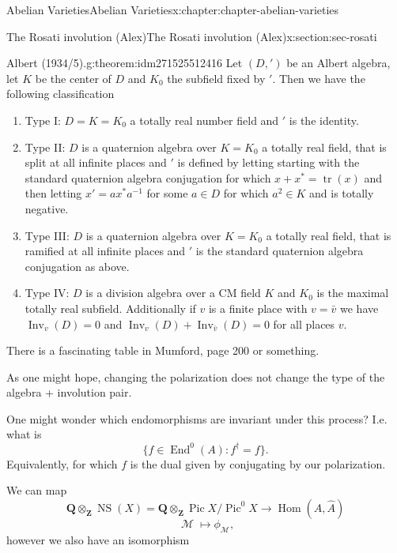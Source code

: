 \documentclass[oneside,10pt,]{book}
\numberwithin{equation}{section}
\newcommand{\sheaf}[1]{\operatorname{\mathcal{#1}}}
\newcommand{\ZZ}{\mathbf{Z}}
\newcommand{\QQ}{\mathbf{Q}}
\DeclareMathOperator{\End}{End}
\DeclareMathOperator{\Hom}{Hom}
\DeclareMathOperator{\Pic}{Pic}
\DeclareMathOperator{\tr}{tr}
\DeclareMathOperator{\NS}{NS}
\begin{document}
\begin{chapterptx}{Abelian Varieties}{}{Abelian Varieties}{}{}{x:chapter:chapter-abelian-varieties}
\begin{sectionptx}{The Rosati involution (Alex)}{}{The Rosati involution (Alex)}{}{}{x:section:sec-rosati}
\begin{theorem}{Albert (1934\slash{}5).}{}{g:theorem:idm271525512416}%
Let \((D, ')\) be an Albert algebra, let \(K\) be the center of \(D\) and \(K_0\) the subfield fixed by \('\). Then we have the following classification%
\begin{enumerate}
\item{}Type I: \(D = K = K_0\) a totally real number field and \('\) is the identity.%
\item{}Type II: \(D\) is a quaternion algebra over \(K = K_0\) a totally real field, that is split at all infinite places and \('\) is defined by letting starting with the standard quaternion algebra conjugation for which \(x + x^* = \tr(x)\) and then letting \(x' = ax^* a^{-1}\) for some \(a \in D\) for which \(a^2 \in K\) and is totally negative.%
\item{}Type III: \(D\) is a quaternion algebra over \(K = K_0\) a totally real field, that is ramified at all infinite places and \('\) is the standard quaternion algebra conjugation as above.%
\item{}Type IV: \(D\) is a division algebra over a CM field \(K\) and \(K_0\) is the maximal totally real subfield. Additionally if \(v\) is a finite place with \(v = \bar v\) we have \(\operatorname{Inv}_v(D) = 0\) and \(\operatorname{Inv}_v(D) + \operatorname{Inv}_{\bar v}(D) = 0\) for all places \(v\).%
\end{enumerate}
%
\end{theorem}
There is a fascinating table in Mumford, page 200 or something.%
\par
As one might hope, changing the polarization does not change the type of the algebra + involution pair.%
\par
One might wonder which endomorphisms are invariant under this process? I.e. what is%
\begin{equation*}
\{f \in \End^0(A) : f^\dagger = f\}\text{.}
\end{equation*}
Equivalently, for which \(f\) is the dual given by conjugating by our polarization.%
\par
We can map%
\begin{equation*}
\QQ \otimes_\ZZ \NS(X) = \QQ \otimes_\ZZ \Pic X/\Pic^0 X \to \Hom(A, \hat A)
\end{equation*}
%
\begin{equation*}
\sheaf M \mapsto \phi_{\sheaf M}\text{,}
\end{equation*}
however we also have an isomorphism%
\begin{equation*}

\end{equation*}
\end{sectionptx}
\end{chapterptx}
\end{document}
